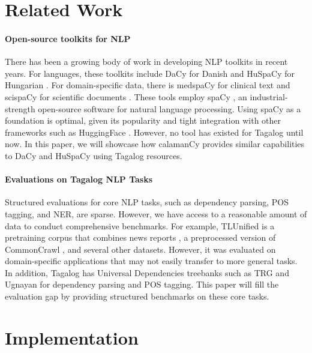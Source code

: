 \documentclass[11pt]{article}
\begin{document}



\section{Related Work}

\paragraph*{Open-source toolkits for NLP}
There has been a growing body of work in developing NLP toolkits in recent years. 
For languages, these toolkits include DaCy for Danish \citep{Enevoldsen2021DaCyAU} and HuSpaCy for Hungarian \citep{Orosz2022HuSpaCyAI}.
For domain-specific data, there is medspaCy for clinical text \citep{Eyre2021LaunchingIC} and scispaCy for scientific documents \citep{Neumann2019ScispaCyFA}.
These tools employ spaCy \citep{Honnibal2020Spacy}, an industrial-strength open-source software for natural language processing.
Using spaCy as a foundation is optimal, given its popularity and tight integration with other frameworks such as HuggingFace \citep{Wolf2019HuggingFacesTS}.
However, no tool has existed for Tagalog until now.
In this paper, we will showcase how calamanCy provides similar capabilities to DaCy and HuSpaCy using Tagalog resources.

\paragraph*{Evaluations on Tagalog NLP Tasks} 
Structured evaluations for core NLP tasks, such as dependency parsing, POS tagging, and NER, are sparse.
However, we have access to a reasonable amount of data to conduct comprehensive benchmarks.
For example, TLUnified \citep{Cruz2021ImprovingLL} is a pretraining corpus that combines news reports \citep{Cruz2020ExploitingNA}, a preprocessed version of CommonCrawl \citep{OrtizSuarez2019AsynchronousPF}, and several other datasets.
However, it was evaluated on domain-specific applications that may not easily transfer to more general tasks.
In addition, Tagalog has Universal Dependencies treebanks such as TRG \citep{Samson2018TRG} and Ugnayan \citep{Aquino2020ParsingIT} for dependency parsing and POS tagging.
This paper will fill the evaluation gap by providing structured benchmarks on these core tasks.

\section{Implementation}
\end{document}
